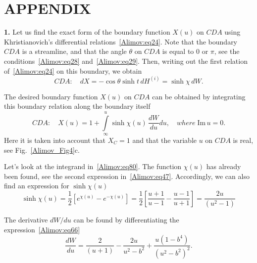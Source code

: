 \documentclass[
11pt,%
tightenlines,%
twoside,%
onecolumn,%
nofloats,%
nobibnotes,%
nofootinbib,%
superscriptaddress,%
noshowpacs,%
centertags]%
{revtex4-2}
\begin{document}
\section*{APPENDIX}

\textbf{1.} Let us find the exact form of the boundary function $X(u)$ on $CDA$ using
Khristianovich's differential relations~\eqref{Alimov:eq24}. Note that the boundary $CDA$ is a
streamline, and that the angle $\theta$ on $CDA$ is equal to $0$ or $\pi $, see the
conditions~\eqref{Alimov:eq28} and~\eqref{Alimov:eq29}. Then, writing out the first relation
of~\eqref{Alimov:eq24} on this boundary, we obtain
\[
 CDA: \quad dX = - \cos \theta \sinh t \, dH^{(i)} = \sinh \chi \, dW.
\]

The desired boundary function $X(u)$ on $CDA$ can be obtained by integrating this boundary relation
along the boundary itself
\begin{equation}
\label{Alimov:eq80} CDA: \quad X(u) = 1 + \int\limits_\infty^u {\sinh \chi (u)\,\frac{dW}{du}du},
\quad where \; \mbox{Im}\,u = 0.
\end{equation}
Here it is taken into account that $X_C = 1$ and that the variable $u$ on $CDA$ is real,
see Fig.~\ref{Alimov_Fig4}c.

Let's look at the integrand in~\eqref{Alimov:eq80}. The function $\chi(u)$ has already been found,
see the second expression in~\eqref{Alimov:eq47}. Accordingly, we can also find an expression for
$\sinh \chi(u)$
\begin{equation}
\label{Alimov:eq81} \sinh \chi(u) = \frac{1}{2}\left[ {e^{\chi(u)} - e^{-\chi(u)}} \right] =
\frac{1}{2}\left[ {\frac{u + 1}{u - 1} - \frac{u - 1}{u + 1}} \right] = \frac{2u}{(u^2 - 1)}
\end{equation}

The derivative ${dW}/{du}$ can be found by differentiating the expression~\eqref{Alimov:eq66}
\begin{equation}
\label{Alimov:eq82} \frac{dW}{du} = \frac{2}{(u + 1)} - \frac{2u}{u^2 - b^2} + \frac{u(1 -
b^4)}{(u^2 - b^2)^2}.
\end{equation}
\end{document}
